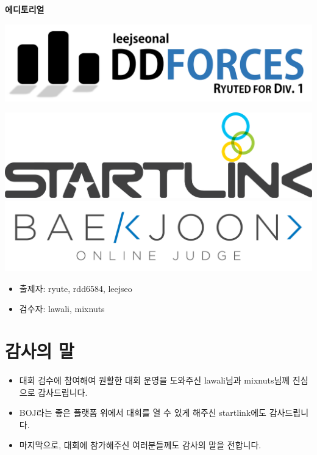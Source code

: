 \documentclass{article}
\begin{document}
	\section{ }
	\begin{center}
		{\Huge \bf 에디토리얼}
	\end{center}
	\vspace{1.5cm}
	\begin{center}
		\includegraphics[scale=0.3]{images/logo.pdf}
	\end{center}
	\vspace{1cm}
	\begin{center}
		\includegraphics[scale=0.5]{images/startlink.png}
		\includegraphics[scale=0.35]{images/boj.png}
	\end{center}
	\begin{itemize}
		\item 출제자: ryute, rdd6584, leejseo
		\item 검수자: lawali, mixnuts
	\end{itemize}
	
	\section{감사의 말}
	\begin{itemize}
		\item 대회 검수에 참여해여 원활한 대회 운영을 도와주신 lawali님과 mixnuts님께 진심으로 감사드립니다.
		\item BOJ라는 좋은 플랫폼 위에서 대회를 열 수 있게 해주신 startlink에도 감사드립니다.
		\item 마지막으로, 대회에 참가해주신 여러분들께도 감사의 말을 전합니다.
	\end{itemize}
	\newpage
\end{document}
